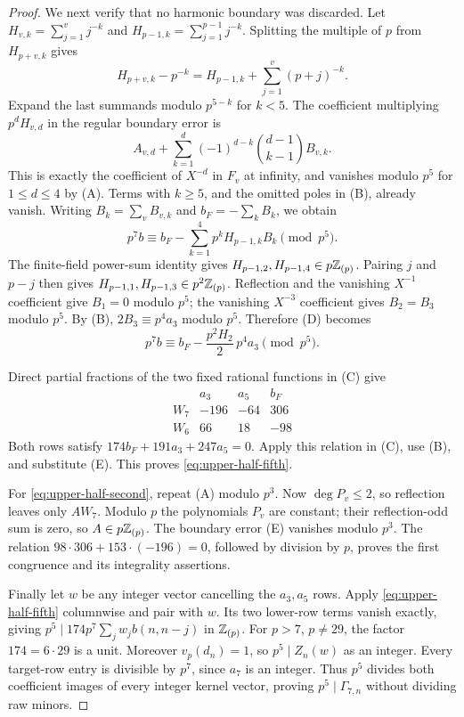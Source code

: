 \begin{proof}
We next verify that no harmonic boundary was discarded. Let
$H_{v,k}=\sum_{j=1}^v j^{-k}$ and $H_{p-1,k}=\sum_{j=1}^{p-1}j^{-k}$.
Splitting the multiple of $p$ from $H_{p+v,k}$ gives
\[
 H_{p+v,k}-p^{-k}
 =H_{p-1,k}+\sum_{j=1}^v(p+j)^{-k}.
\]
Expand the last summands modulo $p^{5-k}$ for $k<5$.
The coefficient multiplying $p^dH_{v,d}$ in the regular boundary error is
\[
 A_{v,d}+\sum_{k=1}^{d}(-1)^{d-k}\binom{d-1}{k-1}B_{v,k}.
\]
This is exactly the coefficient of $X^{-d}$ in $F_v$ at infinity,
and vanishes modulo $p^5$ for $1\le d\le4$ by (A).
Terms with $k\ge5$, and the omitted poles in (B), already vanish.
Writing $B_k=\sum_vB_{v,k}$ and $b_F=-\sum_k B_k$, we obtain
\[
 p^7b\equiv b_F-\sum_{k=1}^4p^kH_{p-1,k}B_k\pmod{p^5}.      \tag{D}
\]
The finite-field power-sum identity gives
$H_{p-1,2},H_{p-1,4}\in p\mathbb Z_{(p)}$.
Pairing $j$ and $p-j$ then gives
$H_{p-1,1},H_{p-1,3}\in p^2\mathbb Z_{(p)}$.
Reflection and the vanishing $X^{-1}$ coefficient give $B_1=0$ modulo
$p^5$; the vanishing $X^{-3}$ coefficient gives $B_2=B_3$ modulo $p^5$.
By (B), $2B_3\equiv p^4a_3$ modulo $p^5$. Therefore (D) becomes
\[
 p^7b\equiv b_F-\frac{p^2H_2}{2}\,p^4a_3\pmod{p^5}.        \tag{E}
\]

Direct partial fractions of the two fixed rational functions in (C) give
\[
\begin{array}{c|rrr}
 &a_3&a_5&b_F\\\hline
 W_7&-196&-64&306\\
 W_6&66&18&-98
\end{array}
\]
Both rows satisfy $174b_F+191a_3+247a_5=0$.
Apply this relation in (C), use (B), and substitute (E).
This proves \eqref{eq:upper-half-fifth}.

For \eqref{eq:upper-half-second}, repeat (A) modulo $p^3$.
Now $\deg P_v\le2$, so reflection leaves only $A W_7$.
Modulo $p$ the polynomials $P_v$ are constant; their reflection-odd sum
is zero, so $A\in p\mathbb Z_{(p)}$.
The boundary error (E) vanishes modulo $p^3$.
The relation $98\cdot306+153\cdot(-196)=0$, followed by division by $p$,
proves the first congruence and its integrality assertions.

Finally let $w$ be any integer vector cancelling the $a_3,a_5$ rows.
Apply \eqref{eq:upper-half-fifth} columnwise and pair with $w$.
Its two lower-row terms vanish exactly, giving
$p^5\mid174p^7\sum_jw_jb(n,n-j)$ in $\mathbb Z_{(p)}$.
For $p>7$, $p\ne29$, the factor $174=6\cdot29$ is a unit.
Moreover $v_p(d_n)=1$, so $p^5\mid Z_n(w)$ as an integer.
Every target-row entry is divisible by $p^7$, since $a_7$ is an integer.
Thus $p^5$ divides both coefficient images of every integer kernel vector,
proving $p^5\mid\Gamma_{7,n}$ without dividing raw minors.
\end{proof}

